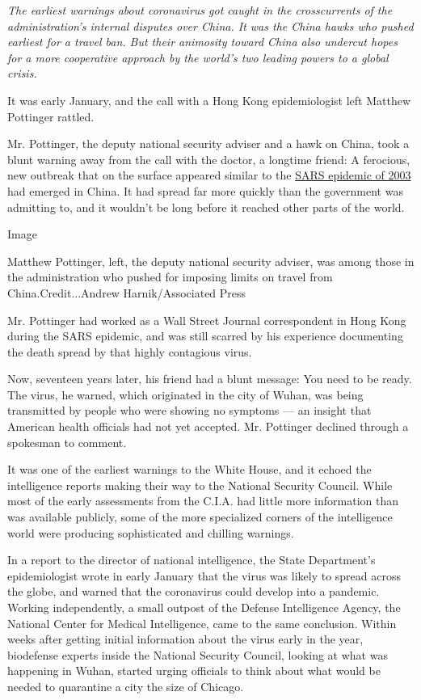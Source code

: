 \emph{The earliest warnings about coronavirus got caught in the
crosscurrents of the administration's internal disputes over China. It
was the China hawks who pushed earliest for a travel ban. But their
animosity toward China also undercut hopes for a more cooperative
approach by the world's two leading powers to a global crisis.}

It was early January, and the call with a Hong Kong epidemiologist left
Matthew Pottinger rattled.

Mr. Pottinger, the deputy national security adviser and a hawk on China,
took a blunt warning away from the call with the doctor, a longtime
friend: A ferocious, new outbreak that on the surface appeared similar
to the
\href{https://www.nytimes3xbfgragh.onion/2003/04/27/world/the-sars-epidemic-the-path-from-china-s-provinces-a-crafty-germ-breaks-out.html}{SARS
epidemic of 2003} had emerged in China. It had spread far more quickly
than the government was admitting to, and it wouldn't be long before it
reached other parts of the world.

Image

Matthew Pottinger, left, the deputy national security adviser, was among
those in the administration who pushed for imposing limits on travel
from China.Credit...Andrew Harnik/Associated Press

Mr. Pottinger had worked as a Wall Street Journal correspondent in Hong
Kong during the SARS epidemic, and was still scarred by his experience
documenting the death spread by that highly contagious virus.

Now, seventeen years later, his friend had a blunt message: You need to
be ready. The virus, he warned, which originated in the city of Wuhan,
was being transmitted by people who were showing no symptoms --- an
insight that American health officials had not yet accepted. Mr.
Pottinger declined through a spokesman to comment.

It was one of the earliest warnings to the White House, and it echoed
the intelligence reports making their way to the National Security
Council. While most of the early assessments from the C.I.A. had little
more information than was available publicly, some of the more
specialized corners of the intelligence world were producing
sophisticated and chilling warnings.

In a report to the director of national intelligence, the State
Department's epidemiologist wrote in early January that the virus was
likely to spread across the globe, and warned that the coronavirus could
develop into a pandemic. Working independently, a small outpost of the
Defense Intelligence Agency, the National Center for Medical
Intelligence, came to the same conclusion. Within weeks after getting
initial information about the virus early in the year, biodefense
experts inside the National Security Council, looking at what was
happening in Wuhan, started urging officials to think about what would
be needed to quarantine a city the size of Chicago.

